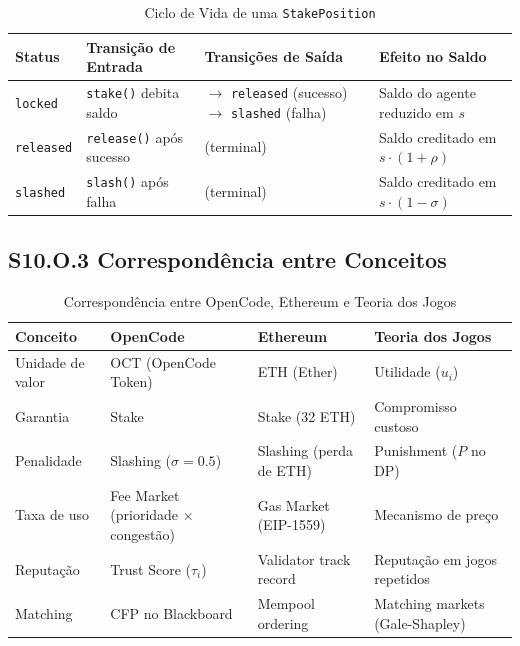 \begin{table}[htbp]
\centering
\caption{Ciclo de Vida de uma \texttt{StakePosition}}
\label{tab:stake_states}
\begin{tabular}{p{2cm}p{5cm}p{4cm}p{4cm}}
\hline
\textbf{Status} & \textbf{Transição de Entrada} & \textbf{Transições de Saída} & \textbf{Efeito no Saldo} \\
\hline
\texttt{locked} & \texttt{stake()} debita saldo & $\to$ \texttt{released} (sucesso) $\to$ \texttt{slashed} (falha) & Saldo do agente reduzido em $s$ \\
\hline
\texttt{released} & \texttt{release()} após sucesso & (terminal) & Saldo creditado em $s \cdot (1 + \rho)$ \\
\hline
\texttt{slashed} & \texttt{slash()} após falha & (terminal) & Saldo creditado em $s \cdot (1 - \sigma)$ \\
\hline
\end{tabular}
\end{table}

\subsection*{S10.O.3 Correspondência entre Conceitos}

\begin{table}[htbp]
\centering
\caption{Correspondência entre OpenCode, Ethereum e Teoria dos Jogos}
\label{tab:correspondence}
\begin{tabular}{p{3cm}p{3.5cm}p{3.5cm}p{3.5cm}}
\hline
\textbf{Conceito} & \textbf{OpenCode} & \textbf{Ethereum} & \textbf{Teoria dos Jogos} \\
\hline
Unidade de valor & OCT (OpenCode Token) & ETH (Ether) & Utilidade ($u_i$) \\
\hline
Garantia & Stake & Stake (32 ETH) & Compromisso custoso \\
\hline
Penalidade & Slashing ($\sigma=0.5$) & Slashing (perda de ETH) & Punishment ($P$ no DP) \\
\hline
Taxa de uso & Fee Market (prioridade $\times$ congestão) & Gas Market (EIP-1559) & Mecanismo de preço \\
\hline
Reputação & Trust Score ($\tau_i$) & Validator track record & Reputação em jogos repetidos \\
\hline
Matching & CFP no Blackboard & Mempool ordering & Matching markets (Gale-Shapley) \\
\hline
\end{tabular}
\end{table}

